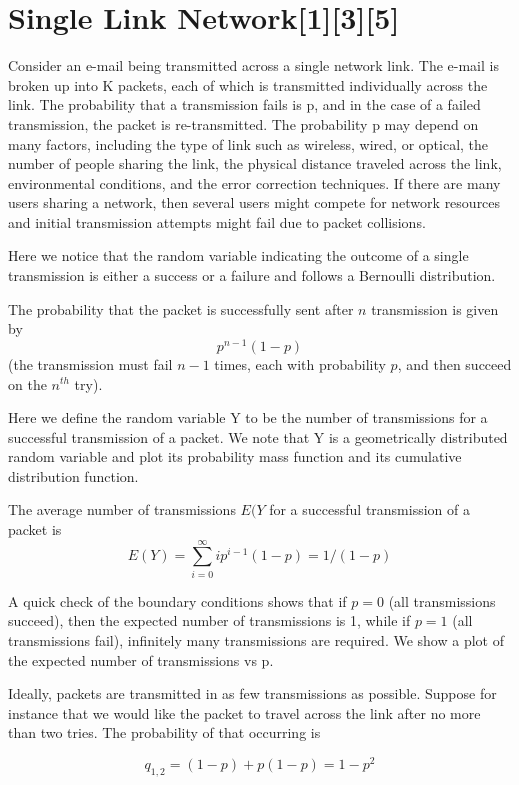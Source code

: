 \documentclass[10pt,twocolumn,letterpaper]{article}
\begin{document}
\section*{Single Link Network{\small[1][3][5]}}

Consider an e-mail being transmitted across a single network link. The e-mail is broken up into K packets, each of which is transmitted individually across the link. The probability that a transmission fails is p, and in the case of a failed transmission, the packet is re-transmitted. The probability p may depend on many factors, including the type of link such as wireless, wired, or optical, the number of people sharing the link, the physical distance traveled across the link, environmental conditions, and the error correction techniques. If there are many users sharing a network, then several users might compete for network resources and initial transmission attempts might fail due to packet collisions. 

Here we notice that the random variable indicating the outcome of a single transmission is either a success or a failure and follows a Bernoulli distribution. 

The probability that the packet is successfully sent after $n$ transmission is given by 
$$p^{n-1}(1-p)$$
(the transmission must fail $n-1$ times, each with probability $p$, and then succeed on the $n^{th}$ try).

Here we define the random variable Y to be the number of transmissions for a successful transmission of a packet. We note that Y is a geometrically distributed random variable and plot its probability mass function and its cumulative distribution function.

The average number of transmissions $E(Y$ for a successful transmission of a packet is
$$ E(Y) = \sum_{i=0}^{\infty} ip^{i-1}(1-p)= 1/(1-p) $$

A quick check of the boundary conditions shows that if $p=0$ (all transmissions succeed), then the expected number of transmissions is 1, while if $p=1$ (all transmissions fail), infinitely many transmissions are required. We show a plot of the expected number of transmissions vs p.

Ideally, packets are transmitted in as few transmissions as possible. Suppose for instance that we would like the packet to travel across the link after no more than two tries. The probability of that occurring is

$$ q_{1,2} = (1-p)+p(1-p)= 1-p^2 $$
\end{document}
